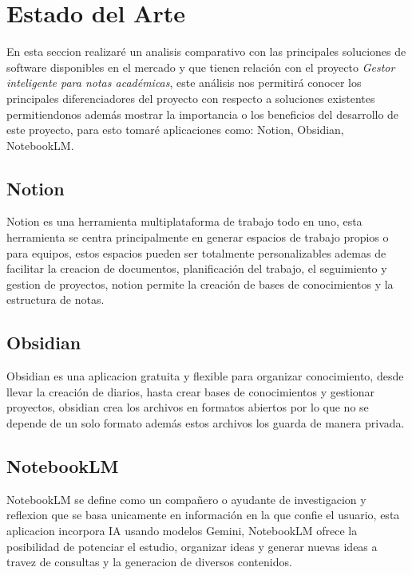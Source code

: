 \chapter{Estado del Arte}
\thispagestyle{fancy}

En esta seccion realizaré un analisis comparativo con las principales soluciones de software disponibles en el mercado y que tienen relación con el proyecto \emph{Gestor inteligente para notas académicas}, este análisis nos permitirá conocer los principales diferenciadores del proyecto con respecto a soluciones existentes permitiendonos además mostrar la importancia o los beneficios del desarrollo de este proyecto, para esto tomaré aplicaciones como: Notion, Obsidian, NotebookLM.

\vspace{.5cm}

\section{Notion} Notion es una herramienta multiplataforma de trabajo todo en uno, esta herramienta se centra principalmente en generar espacios de trabajo propios o para equipos, estos espacios pueden ser totalmente personalizables ademas de facilitar la creacion de documentos, planificación del trabajo, el seguimiento y gestion de proyectos, notion permite la creación de bases de conocimientos y la estructura de notas\cite{Notion_2025,Notion_Personal}.

\vspace{.5cm}

\section{Obsidian} Obsidian es una aplicacion gratuita y flexible para organizar conocimiento, desde llevar la creación de diarios, hasta crear bases de conocimientos y gestionar proyectos, obsidian crea los archivos en formatos abiertos por lo que no se depende de un solo formato además estos archivos los guarda de manera privada\cite{Obsidian}.

\vspace{.5cm}

\section{NotebookLM} NotebookLM se define como un compañero o ayudante de investigacion y reflexion que se basa unicamente en información en la que confie el usuario, esta aplicacion incorpora IA usando modelos Gemini, NotebookLM ofrece la posibilidad de potenciar el estudio, organizar ideas y generar nuevas ideas a travez de consultas y la generacion de diversos contenidos\cite{NotebookLM}.

